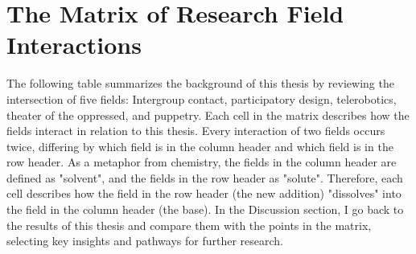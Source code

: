 \documentclass[dissertation,math,vertlayout,pdfa,colorlinks,nologo]{aaltoseries}
\begin{document}
\section{The Matrix of Research Field Interactions}
\label{sec:matrix_of_intersections}
The following table summarizes the background of this thesis by reviewing the intersection of five fields: Intergroup contact, participatory design, telerobotics, theater of the oppressed, and puppetry. Each cell in the matrix describes how the fields interact in relation to this thesis. Every interaction of two fields occurs twice, differing by which field is in the column header and which field is in the row header. As a metaphor from chemistry, the fields in the column header are defined as "solvent", and the fields in the row header as "solute". Therefore, each cell describes how the field in the row header (the new addition) "dissolves" into the field in the column header (the base). In the Discussion section, I go back to the results of this thesis and compare them with the points in the matrix, selecting key insights and pathways for further research.


\end{document}
